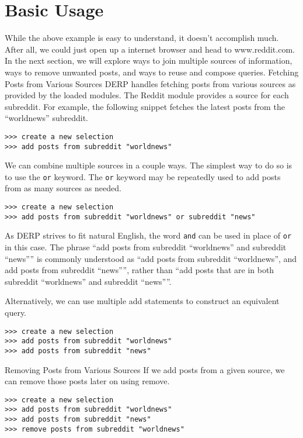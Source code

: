 \section{Basic Usage}
While the above example is easy to understand, it doesn’t accomplish much. After all, we could just open up a internet browser and head to www.reddit.com.
In the next section, we will explore ways to join multiple sources of information, ways to remove unwanted posts, and ways to reuse and compose queries.
Fetching Posts from Various Sources
DERP handles fetching posts from various sources as provided by the loaded modules. The Reddit module provides a source for each subreddit. For example,
the following snippet fetches the latest posts from the “worldnews” subreddit.
\newline\begin{minipage}{\linewidth}\begin{lstlisting}
>>> create a new selection
>>> add posts from subreddit "worldnews"
\end{lstlisting}\end{minipage}
We can combine multiple sources in a couple ways. The simplest way to do so is to use the \texttt{or} keyword. The \texttt{or} keyword may be repeatedly used to add posts
from as many sources as needed.
\newline\begin{minipage}{\linewidth}\begin{lstlisting}
>>> create a new selection
>>> add posts from subreddit "worldnews" or subreddit "news"
\end{lstlisting}\end{minipage}
As DERP strives to fit natural English, the word \texttt{and} can be used in place of \texttt{or} in this case. The phrase “add posts from subreddit “worldnews” and
subreddit “news”” is commonly understood as “add posts from subreddit “worldnews”, and add posts from subreddit “news””, rather than “add posts that
are in both subreddit “worldnews” and subreddit “news””.

Alternatively, we can use multiple add statements to construct an equivalent query.
\newline\begin{minipage}{\linewidth}\begin{lstlisting}
>>> create a new selection
>>> add posts from subreddit "worldnews"
>>> add posts from subreddit "news"
\end{lstlisting}\end{minipage}
Removing Posts from Various Sources
If we add posts from a given source, we can remove those posts later on using remove.
\newline\begin{minipage}{\linewidth}\begin{lstlisting}
>>> create a new selection
>>> add posts from subreddit "worldnews"
>>> add posts from subreddit "news"
>>> remove posts from subreddit "worldnews"
\end{lstlisting}\end{minipage}

